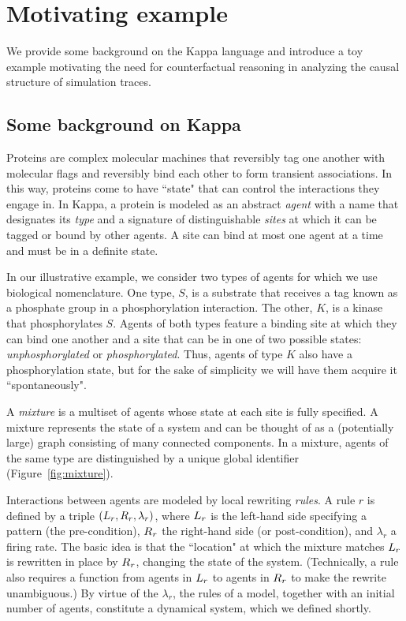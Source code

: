 
\section{Motivating example}\label{sec:example}

We provide some background on the Kappa language and
introduce a toy example motivating the need for counterfactual
reasoning in analyzing the causal structure of simulation traces.

\subsection{Some background on Kappa}\label{sec:background}

Proteins are complex molecular machines that reversibly tag one another with
molecular flags and reversibly bind each other to form transient associations.
In this way, proteins come to have ``state" that can control the interactions
they engage in. In Kappa, a protein is modeled as an abstract \emph{agent} with
a name that designates its \emph{type} and a signature of distinguishable
\emph{sites} at which it can be tagged or bound by other agents. A site can bind
at most one agent at a time and must be in a definite state.

In our illustrative example, we consider two types of agents for
which we use biological nomenclature. One type, $S$, is a substrate
that receives a tag known as a phosphate group in a phosphorylation
interaction. The other, $K$, is a kinase that phosphorylates
$S$. Agents of both types feature a binding site at which they can
bind one another and a site that can be in one of two possible states:
\emph{unphosphorylated} or \emph{phosphorylated}. Thus, agents of type
$K$ also have a phosphorylation state, but for the sake of simplicity
we will have them acquire it ``spontaneously".

A \emph{mixture} is a multiset of agents whose state at each site is
fully specified. A mixture represents the state of a system and can be
thought of as a (potentially large) graph consisting of many connected
components. In a mixture, agents of the same type are distinguished by
a unique global identifier (Figure~\ref{fig:mixture}).



Interactions between agents are
modeled by local rewriting \emph{rules}.  A rule $r$ is defined by a
triple $(L_{r}, R_{r}, \lambda_r)$, where $L_{r}$ is the
left-hand side specifying a pattern (the pre-condition), $R_{r}$
the right-hand side (or post-condition), and $\lambda_r$ a firing rate.
The basic idea is that the ``location" at which the
mixture matches $L_{r}$ is rewritten in place by $R_{r}$, changing the
state of the system. (Technically, a rule also requires a function from
agents in $L_{r}$ to agents in $R_{r}$ to make the rewrite
unambiguous.) By virtue of the $\lambda_r$, the rules of a model,
together with an initial number of agents, constitute a dynamical
system, which we defined shortly.

